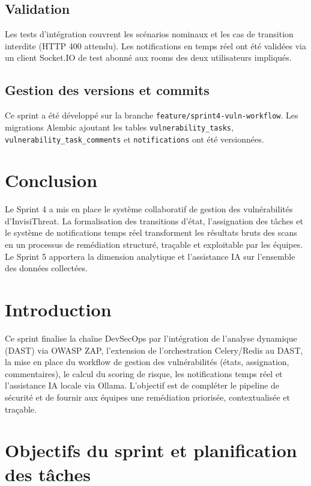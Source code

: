 \subsection{Validation}
Les tests d'intégration couvrent les scénarios nominaux et les cas de transition interdite (HTTP 400 attendu). Les notifications en temps réel ont été validées via un client Socket.IO de test abonné aux rooms des deux utilisateurs impliqués.

\subsection{Gestion des versions et commits}
Ce sprint a été développé sur la branche \texttt{feature/sprint4-vuln-workflow}. Les migrations Alembic ajoutant les tables \texttt{vulnerability\_tasks}, \texttt{vulnerability\_task\_comments} et \texttt{notifications} ont été versionnées.

\section{Conclusion}
Le Sprint 4 a mis en place le système collaboratif de gestion des vulnérabilités d'InvisiThreat. La formalisation des transitions d'état, l'assignation des tâches et le système de notifications temps réel transforment les résultats bruts des scans en un processus de remédiation structuré, traçable et exploitable par les équipes. Le Sprint 5 apportera la dimension analytique et l'assistance IA sur l'ensemble des données collectées.

\section{Introduction}
Ce sprint finalise la chaîne DevSecOps par l'intégration de l'analyse dynamique (DAST) via OWASP ZAP, l'extension de l'orchestration Celery/Redis au DAST, la mise en place du workflow de gestion des vulnérabilités (états, assignation, commentaires), le calcul du scoring de risque, les notifications temps réel et l'assistance IA locale via Ollama. L'objectif est de compléter le pipeline de sécurité et de fournir aux équipes une remédiation priorisée, contextualisée et traçable.

\section{Objectifs du sprint et planification des tâches}

